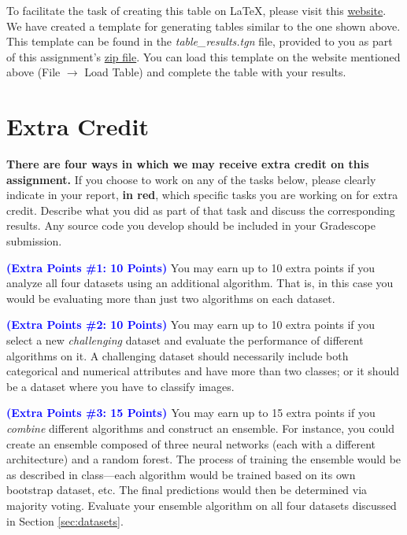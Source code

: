 \documentclass[letterpaper]{article}
\newcommand{\HIGHLIGHT}[1]{\textcolor{blue}{\textbf{#1}}}
\begin{document}
To facilitate the task of creating this table on \LaTeX, please visit this \href{https://www.tablesgenerator.com}{website}. We have created a template for generating tables similar to the one shown above. This template can be found in the \textit{table\_results.tgn} file, provided to you as part of this assignment's  \href{https://people.cs.umass.edu/~bsilva/courses/CMPSCI_589/Spring2024/homeworks/final_project.zip}{zip file}. You can load this template on the website mentioned above (File $\rightarrow$ Load Table) and complete the table with your results.



\newpage

\section{Extra Credit}
\label{sec:extra_credit}

\textbf{There are four ways in which we may receive extra credit on this assignment.} If you choose to work on any of the tasks below, please clearly indicate in your report,  \textcolor{dark-red}{\textbf{in red}}, which specific tasks you are working on for extra credit. Describe what you did as part of that task and discuss the corresponding results. Any source code you develop should be included in your Gradescope submission.

\noindent \HIGHLIGHT{\textcolor{dark-red}{(Extra Points \#1: 10 Points)}}
You may earn up to 10 extra points if you analyze all four datasets using an additional algorithm. That is, in this case you would be evaluating more than just two algorithms on each dataset.

\noindent \HIGHLIGHT{\textcolor{dark-red}{ (Extra Points \#2: 10 Points)} }
You may earn up to 10 extra points if you select a new \textit{challenging} dataset and evaluate the performance of different algorithms on it. A challenging dataset should necessarily include both categorical and numerical attributes and have more than two classes; or it should be a dataset where you have to classify images.

\noindent \HIGHLIGHT{\textcolor{dark-red}{ (Extra Points \#3: 15 Points) }}
You may earn up to 15 extra points if you \textit{combine} different algorithms and construct an ensemble. For instance, you could create an ensemble composed of three neural networks (each with a different architecture) and a random forest. The process of training the ensemble would be as described in class---each algorithm would be trained based on its own bootstrap dataset, etc. The final predictions would then be determined via majority voting. Evaluate your ensemble algorithm on all four datasets discussed in Section \ref{sec:datasets}.
\end{document}

